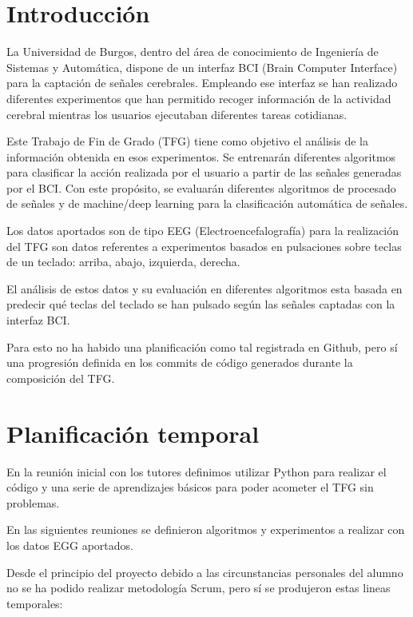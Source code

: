 
\section{Introducción}

La Universidad de Burgos, dentro del área de conocimiento de Ingeniería de Sistemas y Automática, dispone de un interfaz BCI (Brain Computer Interface) para la captación de señales cerebrales. 
Empleando ese interfaz se han realizado diferentes experimentos que han permitido recoger información de la actividad cerebral mientras los usuarios ejecutaban diferentes tareas cotidianas. 

Este Trabajo de Fin de Grado (TFG) tiene como objetivo el análisis de la información obtenida en esos experimentos. Se entrenarán diferentes algoritmos para clasificar la acción realizada por el usuario a partir de las señales generadas por el BCI. Con este propósito, se evaluarán diferentes algoritmos de procesado de señales y de machine/deep learning para la clasificación automática de señales.

Los datos aportados son de tipo EEG (Electroencefalografía) para la realización del TFG son datos referentes a experimentos basados en pulsaciones sobre teclas de un teclado: arriba, abajo, izquierda, derecha.

El análisis de estos datos y su evaluación en diferentes algoritmos esta basada en predecir qué teclas del teclado se han pulsado según las señales captadas con la interfaz BCI.

Para esto no ha habido una planificación como tal registrada en Github, pero sí una progresión definida en los commits de código generados durante la composición del TFG.

\section{Planificación temporal}


En la reunión inicial con los tutores definimos utilizar Python para realizar el código y una serie de aprendizajes básicos para poder acometer el TFG sin problemas.

En las siguientes reuniones se definieron algoritmos y experimentos a realizar con los datos EGG aportados.

Desde el principio del proyecto debido a las circunstancias personales del alumno no se ha podido realizar metodología Scrum, pero sí se produjeron estas lineas temporales:

